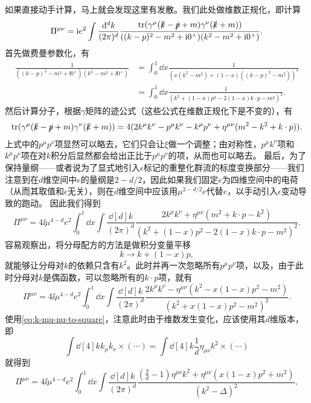 如果直接动手计算，马上就会发现这里有发散。我们此处做维数正规化，即计算
\begin{equation}
    \Pi^{\mu \nu} = \ii e^2 \int \frac{\dd[d]{k}}{(2\pi)^d} \frac{\trace (\gamma^\mu (\slashed{k} - \slashed{p} + m) \gamma^\nu (\slashed{k} + m))}{((k - p)^2 - m^2 + \ii 0^+) (k^2 - m^2 + \ii 0^+)}.
\end{equation}
首先做费曼参数化，有
\[
    \begin{aligned}
        \frac{1}{((k - p)^2 - m^2 + \ii 0^+) (k^2 - m^2 + \ii 0^+)} &= \int_0^1 \dd{x} \frac{1}{(x (k^2 - m^2) + (1-x) ((k - p)^2 - m^2))^2} \\
        &= \int_0^1 \dd{x} \frac{1}{(k^2 + (1-x) p^2 - 2(1-x) k \cdot p - m^2)^2}.
    \end{aligned}
\]
然后计算分子，根据$\gamma$矩阵的迹公式（这些公式在维数正规化下是不变的），有
\[
    \trace (\gamma^\mu (\slashed{k} - \slashed{p} + m) \gamma^\nu (\slashed{k} + m)) = 4 (2 k^\mu k^\nu - p^\mu k^\nu - k^\mu p^\nu + \eta^{\mu \nu} (m^2 - k^2 + k \cdot p)).
\]
上式中的$p^\mu p^\nu$项显然可以略去，它们只会让$\xi$做一个调整；由对称性，$p^\mu k^\nu$项和$k^\mu p^\nu$项在对$k$积分后显然都会给出正比于$p^\mu p^\nu$的项，从而也可以略去。
最后，为了保持量纲——或者说为了显式地引入$\epsilon$标记的重整化群流的标度变换部分——我们注意到在$d$维空间中$e$的量纲是$2-d/2$，因此如果我们固定$e$为四维空间中的电荷（从而其取值和$\epsilon$无关），则在$d$维空间中应该用$\mu^{2-d/2} e$代替$e$，以手动引入$\epsilon$变动导致的跑动。
因此我们得到
\[
    \Pi^{\mu \nu} = 4 \ii \mu^{4-d} e^2 \int_0^1 \dd{x} \int \frac{\dd[d]{k}}{(2\pi)^d} \frac{2k^\mu k^\nu + \eta^{\mu \nu} (m^2 + k \cdot p - k^2)}{(k^2 + (1-x) p^2 - 2(1-x) k \cdot p - m^2)^2}.
\]
容易观察出，将分母配方的方法是做积分变量平移
\[
    k \longrightarrow k + (1-x) p,
\]
就能够让分母对$k$的依赖只含有$k^2$。此时并再一次忽略所有$p^\mu p^\nu$项，以及，由于此时分母对$k$是偶函数，可以忽略所有的$k \cdot p$项，就有
\begin{equation}
    \Pi^{\mu \nu} = 4 \ii \mu^{4-d} e^2 \int_0^1 \dd{x} \int \frac{\dd[d]{k}}{(2\pi)^d} \frac{2k^\mu k^\nu - \eta^{\mu \nu} (k^2 - x(1-x)p^2 - m^2)}{(k^2 + x (1-x) p^2 - m^2)^2}.
\end{equation}
使用\eqref{eq:k-mu-nu-to-square}，注意此时由于维数发生变化，应该使用其$d$维版本，即
\begin{equation}
    \int \dd[4]{k} k_\mu k_\nu \times (\cdots) = \int \dd[4]{k} \frac{1}{d} \eta_{\mu \nu} k^2 \times (\cdots)
\end{equation}
就得到
\[
    \Pi^{\mu \nu} = 4 \ii \mu^{4-d} e^2 \int_0^1 \dd{x} \int \frac{\dd[d]{k}}{(2\pi)^d} \frac{(\frac{2}{d} - 1) \eta^{\mu \nu} k^2 + \eta^{\mu \nu} (x(1-x) p^2 + m^2)}{(k^2 - \Delta)^2},
\]
